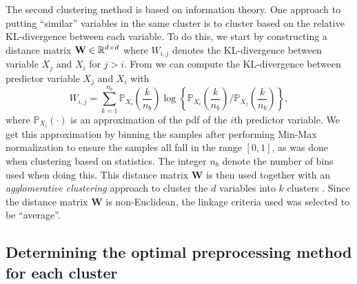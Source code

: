 \documentclass{statsmsc}
\begin{document}
{The second clustering method is based on information theory.
One approach to putting ``similar'' variables in the same cluster is to cluster based on the
relative \ac{KL-divergence} between each variable.
To do this, we start by constructing a
distance matrix $\mathbf{W} \in \mathbb{R}^{d \times d}$ where $W_{i,j}$ denotes the
\ac{KL-divergence} between variable $X_j$ and $X_i$ for $j > i$. From
\citep{mackay} we can compute the \ac{KL-divergence} between predictor variable $X_j$ and $X_i$
with
\begin{equation}
    W_{i,j}= \sum^{n_{b }}_{k=1} \mathbb{P}_{X_i}\left( \frac{k}{n_{b }}  \right)
    \log\left\{
    \mathbb{P}_{X_i}\left( \frac{k}{n_{b }}  \right) \bigg/
    \mathbb{P}_{X_j}\left( \frac{k}{n_{b }}  \right)
\right\},
\end{equation}
where $\mathbb{P}_{X_i}(\cdot)$ is an approximation of the \ac{pdf} of the $i$th predictor variable.
We get this approximation by binning the samples after performing Min-Max normalization to ensure
the samples all fall in the range $[0,1]$, as was done when clustering based on statistics.
The integer $n_{b}$ denote the number of bins used when doing this.
This distance matrix $\mathbf{W}$ is then used together with an \textit{agglomerative clustering}
approach to cluster the $d$ variables into $k$ clusters
\citep{hierarchical_clustering}. Since the distance matrix $\mathbf{W}$ is
non-Euclidean, the linkage criteria used was selected to be ``average''.


\subsection{Determining the optimal preprocessing method for each cluster}%
\label{sub:prep_determine}

}
\end{document}
